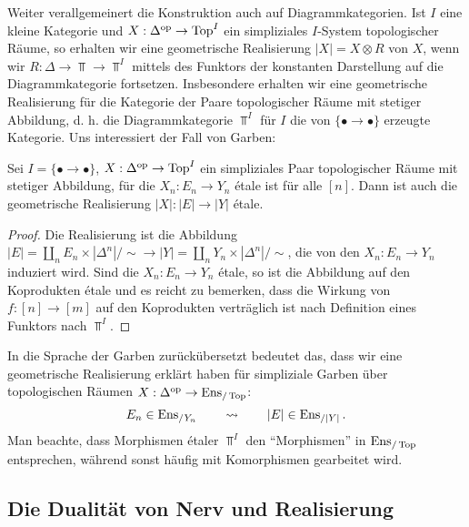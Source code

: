 Weiter verallgemeinert die Konstruktion auch auf
Diagrammkategorien. Ist $I$ eine kleine Kategorie und $X: \Delta^\mathrm{op}
\to \operatorname{Top}^I$ ein simpliziales $I$-System topologischer Räume, so
erhalten wir eine geometrische Realisierung $|X| = X \otimes R$ von
$X$, wenn wir $R: \Delta \to \Top \to \Top^I$ mittels des Funktors der
konstanten Darstellung auf die Diagrammkategorie
fortsetzen. Insbesondere erhalten wir eine geometrische Realisierung
für die Kategorie der Paare topologischer Räume mit stetiger
Abbildung, d. h. die Diagrammkategorie $\Top^I$ für $I$ die von
$\{ \bullet \to \bullet \}$ erzeugte Kategorie. Uns interessiert der
Fall von Garben:
\begin{satz}
  Sei $I = \{ \bullet \to \bullet \}$, $X: \Delta^\mathrm{op} \to \operatorname{Top}^I$ ein
  simpliziales Paar topologischer Räume mit stetiger Abbildung, für
  die $X_n: E_n \to Y_n$ étale ist für alle $[n]$. Dann ist auch die
  geometrische Realisierung $|X|: |E| \to |Y|$ étale.
\end{satz}
\begin{proof}
  Die Realisierung ist die Abbildung $|E| = \coprod_n E_n \times
  |\Delta^n| / \sim \to |Y| = \coprod_n Y_n \times |\Delta^n| / \sim$,
  die von den $X_n: E_n \to Y_n$ induziert wird. Sind die $X_n: E_n
  \to Y_n$ étale, so ist die Abbildung auf den Koprodukten étale und
  es reicht zu bemerken, dass die Wirkung von $f: [n] \to [m]$ auf den
  Koprodukten verträglich ist nach Definition eines Funktors nach
  $\Top^I$.
\end{proof}
In die Sprache der Garben zurückübersetzt bedeutet das, dass wir eine
geometrische Realisierung erklärt haben für simpliziale Garben über
topologischen Räumen $X: \Delta^\mathrm{op} \to \operatorname{Ens}_{/\operatorname{Top}}$:
\[ E_n \in \operatorname{Ens}_{/Y_n} \qquad \rightsquigarrow \qquad |E| \in \operatorname{Ens}_{/|Y|} . \]
Man beachte, dass Morphismen étaler $\Top^I$ den ``Morphismen'' in
$\operatorname{Ens}_{/\operatorname{Top}}$ entsprechen, während sonst häufig mit Komorphismen
gearbeitet wird.

\subsection{Die Dualität von Nerv und Realisierung}

